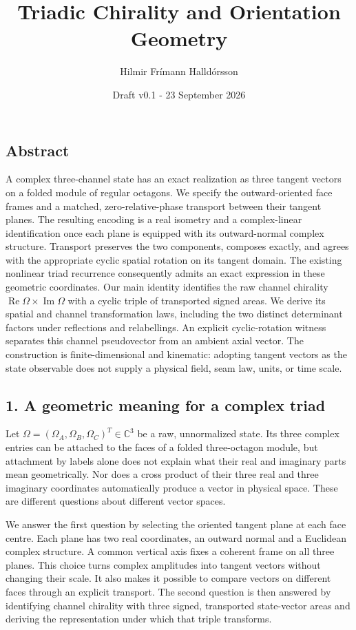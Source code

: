 \documentclass[
  11pt,
  a4paper,
]{article}
\title{Triadic Chirality and Orientation Geometry}
\author{Hilmir Frímann Halldórsson}
\date{Draft v0.1 - 23 September 2026}
\begin{document}
\maketitle

\subsection{Abstract}\label{abstract}

A complex three-channel state has an exact realization as three tangent vectors on a folded module of regular octagons. We specify the outward-oriented face frames and a matched, zero-relative-phase transport between their tangent planes. The resulting encoding is a real isometry and a complex-linear identification once each plane is equipped with its outward-normal complex structure. Transport preserves the two components, composes exactly, and agrees with the appropriate cyclic spatial rotation on its tangent domain. The existing nonlinear triad recurrence consequently admits an exact expression in these geometric coordinates. Our main identity identifies the raw channel chirality \(\operatorname{Re}\Omega\times\operatorname{Im}\Omega\) with a cyclic triple of transported signed areas. We derive its spatial and channel transformation laws, including the two distinct determinant factors under reflections and relabellings. An explicit cyclic-rotation witness separates this channel pseudovector from an ambient axial vector. The construction is finite-dimensional and kinematic: adopting tangent vectors as the state observable does not supply a physical field, seam law, units, or time scale.

\subsection{1. A geometric meaning for a complex triad}\label{a-geometric-meaning-for-a-complex-triad}

Let \(\Omega=(\Omega_A,\Omega_B,\Omega_C)^T\in\mathbb C^3\) be a raw, unnormalized state. Its three complex entries can be attached to the faces of a folded three-octagon module, but attachment by labels alone does not explain what their real and imaginary parts mean geometrically. Nor does a cross product of their three real and three imaginary coordinates automatically produce a vector in physical space. These are different questions about different vector spaces.

We answer the first question by selecting the oriented tangent plane at each face centre. Each plane has two real coordinates, an outward normal and a Euclidean complex structure. A common vertical axis fixes a coherent frame on all three planes. This choice turns complex amplitudes into tangent vectors without changing their scale. It also makes it possible to compare vectors on different faces through an explicit transport. The second question is then answered by identifying channel chirality with three signed, transported state-vector areas and deriving the representation under which that triple transforms.
\end{document}
